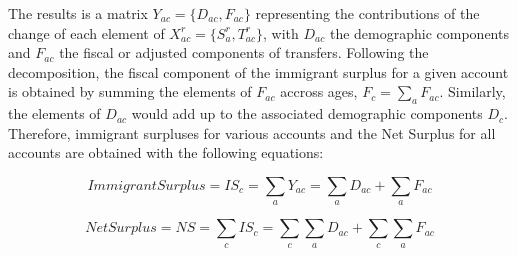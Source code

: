 The results is a matrix \( Y_{ac} = \{D_{ac}, F_{ac} \} \) representing the contributions of the change of each element of \( X^{r}_{ac} =  \{S^{r}_a, T^{r}_{ac} \}\), with \( D_{ac}\) the demographic components and \( F_{ac}\) the fiscal or adjusted components of transfers.
Following the decomposition, the fiscal component of the immigrant surplus for a given account is obtained by summing the elements of \( F_{ac} \) accross ages, \( F_{c}= \displaystyle\sum_{a}F_{ac} \).
Similarly, the elements of \( D_{ac} \) would add up to the associated demographic components \( D_{c}\). Therefore, immigrant surpluses for various accounts and the Net Surplus for all accounts are obtained with the following equations:

\begin{equation}\label{eq:dc3}
  Immigrant Surplus =IS_{c} = \displaystyle\sum_{a}Y_{ac} = \displaystyle\sum_{a}D_{ac} + \displaystyle\sum_{a}F_{ac}
\end{equation}

\begin{equation}\label{eq:dc4}
  Net Surplus = NS = \displaystyle\sum_{c}IS_{c} = \displaystyle\sum_{c}\displaystyle\sum_{a}D_{ac} + \displaystyle\sum_{c}\displaystyle\sum_{a}F_{ac}
\end{equation}

